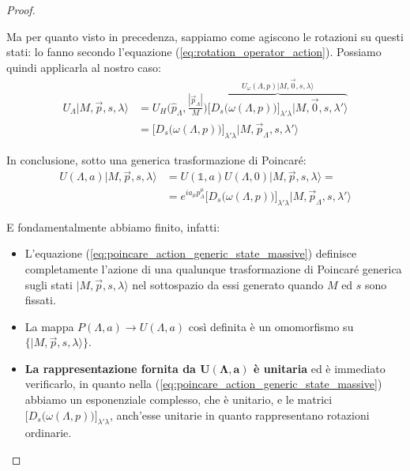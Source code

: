 \documentclass[../main.tex]{subfiles}
\begin{document}
\begin{proof}
\begin{itemize}
    Ma per quanto visto in precedenza, sappiamo come agiscono le rotazioni su questi stati: lo fanno secondo l'equazione (\ref{eq:rotation_operator_action}). Possiamo quindi applicarla al nostro caso:
    \begin{align*}
        U_\Lambda|M,\Vec{p},s,\lambda\rangle &=  U_H\Big(\hat{p}_\Lambda, \frac{|\Vec{p}_\Lambda|}{M}\Big)  \overbrace{\Big[D_s\big(\omega(\Lambda, p)\big)\Big]_{\lambda'\lambda} |M,\Vec{0},s,\lambda'\rangle}^{U_\omega(\Lambda, p)|M,\Vec{0},s,\lambda\rangle} \\
        &= \Big[D_s\big(\omega(\Lambda, p)\big)\Big]_{\lambda'\lambda} |M,\Vec{p}_\Lambda,s,\lambda'\rangle
    \end{align*}
\end{itemize}
In conclusione, sotto una generica trasformazione di Poincaré:
\begin{equation}
    \boxed{\begin{aligned}
    U(\Lambda,a)|M,\Vec{p},s,\lambda\rangle &= U(\mathbb 1, a)U(\Lambda, 0) |M,\Vec{p},s,\lambda\rangle =\\
    &=e^{ia_\mu p_\Lambda^\mu}\Big[D_s\big(\omega(\Lambda, p)\big)\Big]_{\lambda'\lambda} |M,\Vec{p}_\Lambda,s,\lambda'\rangle
    \end{aligned}}
    \label{eq:poincare_action_generic_state_massive}
\end{equation}

E fondamentalmente abbiamo finito, infatti:
\begin{itemize}
    \item[\blacksquare] L'equazione (\ref{eq:poincare_action_generic_state_massive}) definisce completamente l'azione di una qualunque trasformazione di Poincaré generica sugli stati $|M,\Vec{p},s,\lambda\rangle$ nel sottospazio da essi generato quando $M$ ed $s$ sono fissati.

    \item[\blacksquare] La mappa \(P(\Lambda,a) \rightarrow U(\Lambda,a)\) così definita è un omomorfismo su \(\Big\{|M,\Vec{p},s,\lambda\rangle\Big\}\).

    \item[\blacksquare] \textbf{La rappresentazione fornita da $\mathbf{U(\Lambda,a)}$ è unitaria} ed è immediato verificarlo, in quanto nella (\ref{eq:poincare_action_generic_state_massive}) abbiamo un esponenziale complesso, che è unitario, e le matrici \(\Big[D_s\big(\omega(\Lambda, p)\big)\Big]_{\lambda'\lambda}\), anch'esse unitarie in quanto rappresentano rotazioni ordinarie.


\end{itemize}
\end{proof}
\end{document}
